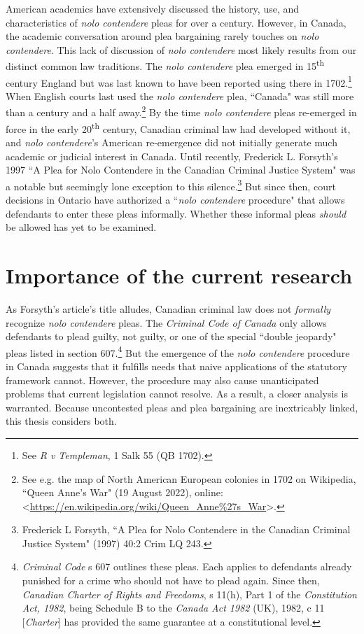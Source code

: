American academics have extensively discussed the history, use, and characteristics of \textit{nolo contendere} pleas for over a century. However, in Canada, the academic conversation around plea bargaining rarely touches on \textit{nolo contendere}. This lack of discussion of \textit{nolo contendere} most likely results from our distinct common law traditions. The \textit{nolo contendere} plea emerged in 15\textsuperscript{th} century England but was last known to have been reported using there in 1702.\footnote{See \textit{R v Templeman}, 1 Salk 55 (QB 1702).} When English courts last used the \textit{nolo contendere} plea, ``Canada" was still more than a century and a half away.\footnote{See e.g. the map of North American European colonies in 1702 on Wikipedia, ``Queen Anne's War" (19 August 2022), online: \textless \url{https://en.wikipedia.org/wiki/Queen_Anne\%27s_War}\textgreater.} By the time \textit{nolo contendere} pleas re-emerged in force in the early 20\textsuperscript{th} century, Canadian criminal law had developed without it, and \textit{nolo contendere}'s American re-emergence did not initially generate much academic or judicial interest in Canada. Until recently, Frederick L. Forsyth's 1997 ``A Plea for Nolo Contendere in the Canadian Criminal Justice System" was a notable but seemingly lone exception to this silence.\footnote{Frederick L Forsyth, ``A Plea for Nolo Contendere in the Canadian Criminal Justice System" (1997) 40:2 Crim LQ 243.} But since then, court decisions in Ontario have authorized a ``\textit{nolo contendere} procedure" that allows defendants to enter these pleas informally. Whether these informal pleas \textit{should} be allowed has yet to be examined. 

\section{Importance of the current research}

As Forsyth's article's title alludes, Canadian criminal law does not \textit{formally} recognize \textit{nolo contendere} pleas. The \textit{Criminal Code of Canada} only allows defendants to plead guilty, not guilty, or one of the special ``double jeopardy" pleas listed in section 607.\footnote{\textit{Criminal Code} s 607 outlines these pleas. Each applies to defendants already punished for a crime who should not have to plead again. Since then, \textit{Canadian Charter of Rights and Freedoms}, s 11(h), Part 1 of the \textit{Constitution Act, 1982}, being Schedule B to the \textit{Canada Act 1982} (UK), 1982, c 11 [\textit{Charter}] has provided the same guarantee at a constitutional level.} But the emergence of the \textit{nolo contendere} procedure in Canada suggests that it fulfills needs that naive applications of the statutory framework cannot. However, the procedure may also cause unanticipated problems that current legislation cannot resolve. As a result, a closer analysis is warranted. Because uncontested pleas and plea bargaining are inextricably linked, this thesis considers both.

